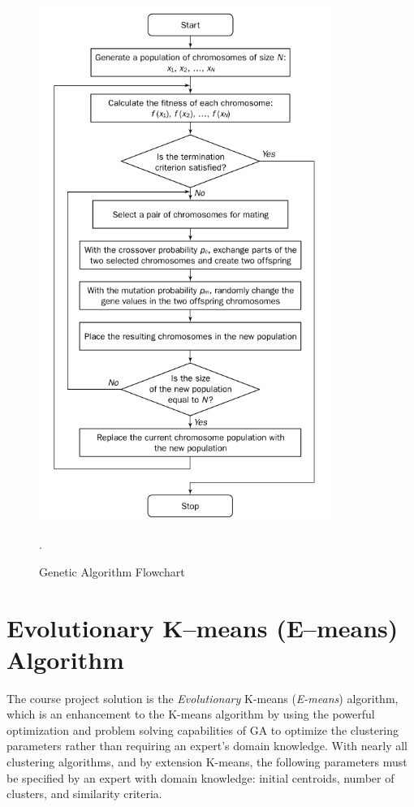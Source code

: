 \documentclass{article}
\begin{document}
\begin{figure}[H]
\centering
\includegraphics[width=0.85\textwidth]{figures/ga-flowchart}
\caption{Genetic Algorithm Flowchart\cite{negnevitsky2011artificial}}.
\label{fig:ga-flowchart}
\end{figure}




\section{Evolutionary K--means (E--means) Algorithm}

The course project solution is the \emph{Evolutionary} K-means (\emph{E-means}) algorithm, which is an enhancement to the K-means algorithm by using the powerful optimization and problem solving capabilities of GA to optimize the clustering parameters rather than requiring an expert's domain knowledge. With nearly all clustering algorithms, and by extension K-means, the following parameters must be specified by an expert with domain knowledge: initial centroids, number of clusters, and similarity criteria.
\end{document}
